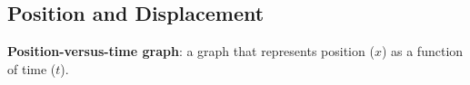 %
%
%
%

    \subsection{Position and Displacement}
        \textbf{Position-versus-time graph}: a graph that represents position ($x$) as a function of time ($t$).

